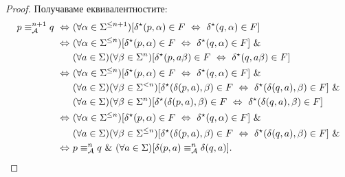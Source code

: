 \begin{proof}
  Получаваме еквивалентностите:
  \begin{align*}
    p \equiv^{n+1}_{\mathcal{A}} q \ \Leftrightarrow\  & (\forall \alpha\in\Sigma^{\leq n+1})[\delta^\star(p,\alpha) \in F \ \Leftrightarrow\  \delta^\star(q,\alpha) \in F] \\
    \ \Leftrightarrow\  & (\forall \alpha\in\Sigma^{\leq n})[\delta^\star(p,\alpha) \in F \ \Leftrightarrow\  \delta^\star(q,\alpha) \in F]\ \&\\
                             & (\forall a \in \Sigma)(\forall \beta\in\Sigma^n)[\delta^\star(p,a\beta) \in F \ \Leftrightarrow\  \delta^\star(q,a\beta) \in F]\\
    \ \Leftrightarrow\  & (\forall \alpha\in\Sigma^{\leq n})[\delta^\star(p,\alpha) \in F \ \Leftrightarrow\  \delta^\star(q,\alpha) \in F]\ \&\\
                              & (\forall a\in\Sigma)(\forall \beta\in\Sigma^{< n})[\delta^\star(\delta(p,a),\beta) \in F \ \Leftrightarrow\  \delta^\star(\delta(q,a),\beta) \in F]\ \&\\
                             & (\forall a \in \Sigma)(\forall \beta\in\Sigma^n)[\delta^\star(\delta(p,a),\beta) \in F \ \Leftrightarrow\  \delta^\star(\delta(q,a),\beta) \in F]\\
    \ \Leftrightarrow\  & (\forall \alpha\in\Sigma^{\leq n})[\delta^\star(p,\alpha) \in F \ \Leftrightarrow\  \delta^\star(q,\alpha) \in F]\ \&\\
                             & (\forall a\in\Sigma)(\forall \beta\in\Sigma^{\leq n})[\delta^\star(\delta(p,a),\beta) \in F \ \Leftrightarrow\  \delta^\star(\delta(q,a),\beta) \in F]\ \&\\
    \ \Leftrightarrow\  & p \equiv^n_{\mathcal{A}} q\ \&\ (\forall a \in \Sigma)[ \delta(p,a) \equiv^n_{\mathcal{A}} \delta(q,a)].
  \end{align*}
  
\end{proof}

